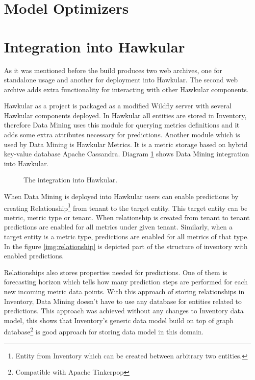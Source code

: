     \section{Model Optimizers}

    \section{Integration into Hawkular}
    As it was mentioned before the build produces two web archives, one for standalone usage and another for
    deployment into Hawkular. The second web archive adds extra functionality for interacting with other Hawkular
    components.

    Hawkular as a project is packaged as a modified Wildfly server with several Hawkular components
    deployed. In Hawkular all entities are stored in Inventory, therefore Data Mining uses this module
    for querying metrics definitions and it adds some extra attributes necessary for predictions. Another module
    which is used by Data Mining is Hawkular Metrics. It is a metric storage based on hybrid key-value
    database Apache Cassandra. Diagram \ref{img:hawkular-interaction} shows Data Mining integration into Hawkular.

    \begin{figure}[H]
        \begin{center}
            \caption{The integration into Hawkular.}
            \label{img:hawkular-interaction}
        \end{center}
    \end{figure}

    When Data Mining is deployed into Hawkular users can enable predictions by creating Relationship\footnote{Entity
    from Inventory which can be created between arbitrary two entities.} from tenant to the target entity. This target
    entity can be metric, metric type or tenant. When relationship is created from tenant to tenant predictions are
    enabled for all metrics under given tenant. Similarly, when a target entity is a metric type, predictions are
    enabled for all metrics of that type. In the figure \ref{img:relationship} is depicted part of the structure of
    inventory with enabled predictions.

    Relationships also stores properties needed for predictions. One of them is
    forecasting horizon which tells how many prediction steps are performed for each new incoming metric data
    points. With this approach of storing relationships in Inventory, Data Mining doesn't have to use any database for
    entities related to predictions. This approach was achieved without any changes to Inventory data
    model, this shows that Inventory's generic data model build on top of graph database\footnote{Compatible with
    Apache Tinkerpop} is good approach for storing data model in this domain.

